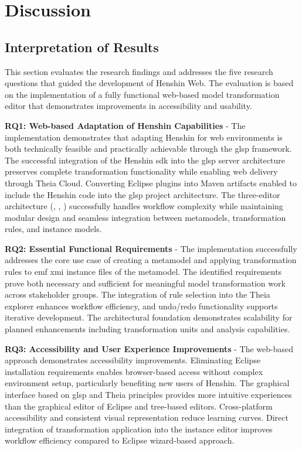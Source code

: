 \chapter{Discussion}
  \label{sec:discussion}

  \section{Interpretation of Results}
  \label{subsec:interpretation-results}

  This section evaluates the research findings and addresses the five research questions that guided the development of Henshin Web. The evaluation is based on the implementation of a fully functional web-based model transformation editor that demonstrates improvements in accessibility and usability.

  \textbf{RQ1: Web-based Adaptation of Henshin Capabilities} - The implementation demonstrates that adapting Henshin for web environments is both technically feasible and practically achievable through the \ac{glsp} framework. The successful integration of the Henshin \ac{sdk} into the \ac{glsp} server architecture preserves complete transformation functionality while enabling web delivery through Theia Cloud. Converting Eclipse plugins into Maven artifacts enabled to include the Henshin code into the \ac{glsp} project architecture. The three-editor architecture (, , ) successfully handles workflow complexity while maintaining modular design and seamless integration between metamodels, transformation rules, and instance models.

  \textbf{RQ2: Essential Functional Requirements} - The implementation successfully addresses the core use case of creating a metamodel and applying transformation rules to \ac{emf} \ac{xmi} instance files of the metamodel. The identified requirements prove both necessary and sufficient for meaningful model transformation work across stakeholder groups. The integration of rule selection into the Theia explorer enhances workflow efficiency, and undo/redo functionality supports iterative development. The architectural foundation demonstrates scalability for planned enhancements including transformation units and analysis capabilities.

  \textbf{RQ3: Accessibility and User Experience Improvements} - The web-based approach demonstrates accessibility improvements. Eliminating Eclipse installation requirements enables browser-based access without complex environment setup, particularly benefiting new users of Henshin. The graphical interface based on \ac{glsp} and Theia principles provides more intuitive experiences than the graphical editor of Eclipse and tree-based editors. Cross-platform accessibility and consistent visual representation reduce learning curves. Direct integration of transformation application into the instance editor improves workflow efficiency compared to Eclipse wizard-based approach.

